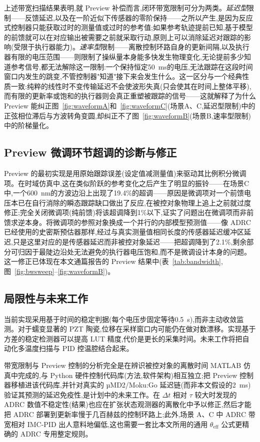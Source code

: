 \documentclass[fleqn,10pt]{wlscirep}
\begin{document}
上述带宽扫描结果表明,就 Preview 补偿而言,闭环带宽限制可分为两类。\emph{延迟型}限制——反馈延迟,以及在一阶近似下传感器的零阶保持——之所以产生,是因为反应式控制器只能获取过时的测量值或过时的参考值;如果参考轨迹提前已知,基于模型的前馈就可以在对应输出被需要之前就采取行动,原则上可以消除延迟对跟踪的影响(受限于执行器能力)。\emph{速率型}限制——离散控制环路自身的更新间隔,以及执行器有限的电压范围——则限制了操纵量本身能多快发生物理变化,无论提前多少知道参考信号,都无法解除这一限制:一个保持恒定\SI{50}{ms}的电压,无法跟踪在这段时间窗口内发生的跳变,不管控制器"知道"接下来会发生什么。这一区分与一个经典性质一致:纯粹的线性时不变传输延迟不会使波形失真(只会使其在时间上整体平移),而有限的更新率或饱和的执行器则会真正重塑被跟踪的信号——这就解释了为什么 Preview 能纠正图~\ref{fig:waveformA}和~\ref{fig:waveformC}(场景A、C,延迟型限制)中的正弦相位滞后与方波转角变圆,却纠正不了图~\ref{fig:waveformB}(场景B,速率型限制)中的阶梯量化。

\subsection*{Preview 微调环节超调的诊断与修正}

Preview 的最初实现是用原始跟踪误差(设定值减测量值)来驱动其比例积分微调项。在时域仿真中,这在类似阶跃的参考变化之后产生了明显的振铃——在场景C中,一个\SI{600}{nm}的方波边沿上出现了19.4\%的超调——原因是微调项对一个前馈电压本已在自行消除的瞬态跟踪缺口做出了反应,在被控对象物理上追上之前就过度修正;完全关闭微调项(纯前馈)将该超调降到1\%以下,证实了问题出在微调项而非前馈求逆本身。将微调项的参照对象换成一个并行的内部模型预测值——像 ADRC 已经使用的史密斯预估器那样,经过与真实测量值相同长度的传感器延迟缓冲区延迟,只是这里对应的是传感器延迟而非被控对象延迟——把超调降到了2.1\%,剩余部分可归因于最陡边沿处无法避免的执行器电压饱和,而不是微调设计本身的问题。这一修正已体现在本文通篇报告的 Preview 结果中(表~\ref{tab:bandwidth},图~\ref{fig:bwsweep}--\ref{fig:waveformB})。

\subsection*{局限性与未来工作}

当前实现采用基于时间的稳定判据(每个电压步固定等待\SI{0.5}{s}),而非主动收敛监测。对于蠕变显著的 PZT 陶瓷,位移在采样窗口内可能仍在做对数漂移。实现基于方差的稳定检测器可以提高 LUT 精度,代价是更长的采集时间。未来工作将把自动化多温度扫描与 PID 控温腔结合起来。

带宽限制与 Preview 控制的分析完全是在辨识被控对象的离散时间 MATLAB 仿真中完成的,与 Python 硬件控制代码库(方法,软件架构)相互独立;把 Preview 控制器移植进该代码库,并针对真实的 µMD2/Moku:Go 延迟链(而非本文假设的\SI{2}{ms})验证其预测的延迟免疫性,是计划中的未来工作。在 $\Delta t$ 相对 $\tau$ 较大时发现的 ADRC 数值不稳定性(结果)也应在扩张状态观测器的离散化中予以修正,然后才能把 ADRC 部署到更新率慢于几百赫兹的控制环路上;此外,场景 A、C 中 ADRC 带宽相对 IMC-PID 出人意料地偏低,这也需要一套比本文所用的通用 $\theta_\text{eff}$ 公式更精确的 ADRC 专用整定规则。
\end{document}
